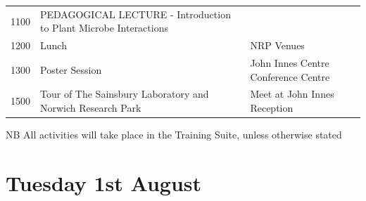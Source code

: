 \documentclass[12pt,]{book}
\theoremstyle{definition}
\theoremstyle{definition}
\theoremstyle{remark}
\begin{document}
\begin{longtable}[]{@{}lll@{}}
\begin{minipage}[t]{0.09\columnwidth}
1100\strut
\end{minipage} & \begin{minipage}[t]{0.38\columnwidth}\raggedright\strut
PEDAGOGICAL LECTURE - Introduction to Plant Microbe Interactions\strut
\end{minipage} & \begin{minipage}[t]{0.38\columnwidth}\raggedright\strut
\strut
\end{minipage}\tabularnewline
\begin{minipage}[t]{0.09\columnwidth}\raggedright\strut
1200\strut
\end{minipage} & \begin{minipage}[t]{0.38\columnwidth}\raggedright\strut
Lunch\strut
\end{minipage} & \begin{minipage}[t]{0.38\columnwidth}\raggedright\strut
NRP Venues\strut
\end{minipage}\tabularnewline
\begin{minipage}[t]{0.09\columnwidth}\raggedright\strut
1300\strut
\end{minipage} & \begin{minipage}[t]{0.38\columnwidth}\raggedright\strut
Poster Session\strut
\end{minipage} & \begin{minipage}[t]{0.38\columnwidth}\raggedright\strut
John Innes Centre Conference Centre\strut
\end{minipage}\tabularnewline
\begin{minipage}[t]{0.09\columnwidth}\raggedright\strut
1500\strut
\end{minipage} & \begin{minipage}[t]{0.38\columnwidth}\raggedright\strut
Tour of The Sainsbury Laboratory and Norwich Research Park\strut
\end{minipage} & \begin{minipage}[t]{0.38\columnwidth}\raggedright\strut
Meet at John Innes Reception\strut
\end{minipage}\tabularnewline
\bottomrule
\end{longtable}

NB All activities will take place in the Training Suite, unless
otherwise stated

\section*{Tuesday 1st August}\label{tuesday-1st-august}
\end{document}
